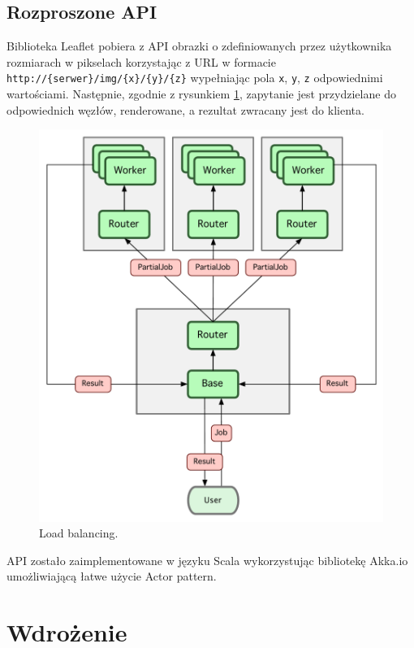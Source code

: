 \documentclass[wide,a4paper,titlepage,12pt]{article}
\begin{document}
\subsection{Rozproszone API}

Biblioteka Leaflet pobiera z API obrazki o zdefiniowanych przez użytkownika rozmiarach w pikselach
korzystając z URL w formacie \texttt{http://\{serwer\}/img/\{x\}/\{y\}/\{z\}}
wypełniając pola \texttt{x}, \texttt{y}, \texttt{z} odpowiednimi
wartościami. Następnie, zgodnie z rysunkiem \ref{fig:loadbalancing}, zapytanie
jest przydzielane do odpowiednich węzłów, renderowane, a rezultat
zwracany jest do klienta.

\begin{figure}[h!]
\begin{center}
\includegraphics[scale=0.5]{schema.pdf}
\end{center}
\caption{Load balancing.}
\label{fig:loadbalancing}
\end{figure}

API zostało zaimplementowane w języku Scala wykorzystując bibliotekę Akka.io
umożliwiającą łatwe użycie Actor pattern.

\section{Wdrożenie}
\end{document}

